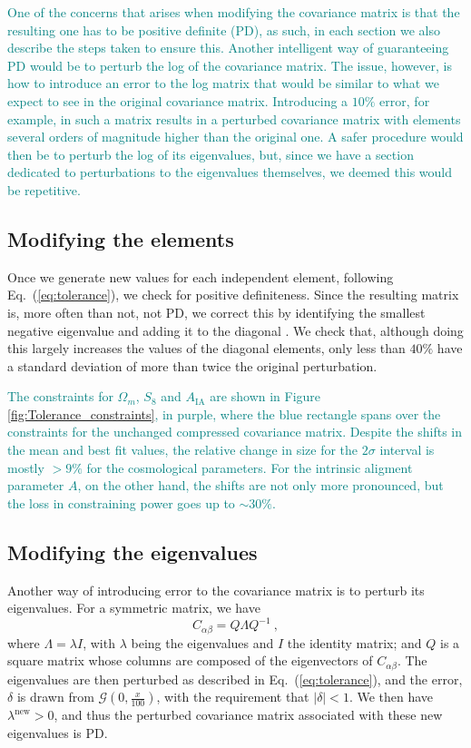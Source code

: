 \documentclass[twocolumn]{\docclass}
\newcommand{\rf}[1]{Figure \ref{fig:#1}}
\newcommand{\ec}[1]{Eq.~(\ref{eq:#1})}
\newcommand\be{\begin{equation}}
\newcommand\ee{\end{equation}}
\begin{document}
	\textcolor{teal}{One of the concerns that arises when modifying the covariance matrix is that the resulting one has to be positive definite (PD), as such, in each section we also describe the steps taken to ensure this. Another intelligent way of guaranteeing PD would be to perturb the log of the covariance matrix. The issue, however, is how to introduce an error to the log matrix that would be similar to what we expect to see in the original covariance matrix. Introducing a $10\%$ error, for example, in such a matrix results in a perturbed covariance matrix with elements several orders of magnitude higher than the original one. A safer procedure would then be to perturb the log of its eigenvalues, but, since we have a section dedicated to perturbations to the eigenvalues themselves, we deemed this would be repetitive.}
	
	\subsection{Modifying the elements}
	
	Once we generate new values for each independent element, following \ec{tolerance}, we check for positive definiteness. Since the resulting matrix is, more often than not, not PD, we correct this by identifying the smallest negative eigenvalue and adding it to the diagonal \cite{Yuan:2008}. We check that, although doing this largely increases the values of the diagonal elements, only less than $40 \%$ have a standard deviation of more than twice the original perturbation. 
	
	\textcolor{teal}{The constraints for $\Omega_m$, $S_8$ and $A_{\mathrm{IA}}$ are shown in \rf{Tolerance_constraints}, in purple, where the blue rectangle spans over the constraints for the unchanged compressed covariance matrix. Despite the shifts in the mean and best fit values, the relative change in size for the $2\sigma$ interval is mostly $> 9 \%$ for the cosmological parameters. For the intrinsic aligment parameter $A$, on the other hand, the shifts are not only more pronounced, but the loss in constraining power goes up to $\sim 30 \%$.}
	
	\subsection{Modifying the eigenvalues}
	
	Another way of introducing error to the covariance matrix is to perturb its eigenvalues. For a symmetric matrix, we have
	\be
	C_{\alpha \beta} = Q\Lambda Q^{-1}\ 
	,\ee
	where $\Lambda = \lambda I$, with $\lambda$ being the eigenvalues and $I$ the identity matrix; and $Q$ is a square matrix whose columns are composed of the eigenvectors of $C_{\alpha \beta}$. The eigenvalues are then perturbed as described in \ec{tolerance}, and the error, $\delta$ is drawn from $\mathcal{G}(0,\frac{x}{100})$, with the requirement that $|\delta| < 1$. We then have $\lambda^{\mathrm{new}} > 0$, and thus the perturbed covariance matrix associated with these new eigenvalues is PD. 
	
\end{document}
